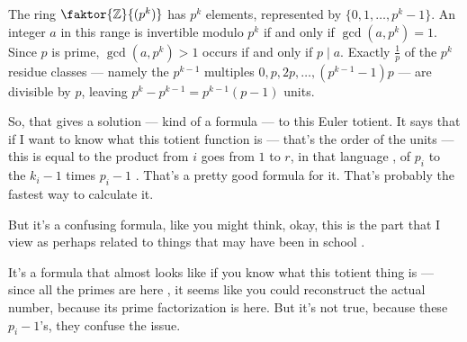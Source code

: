 \begin{content}

\begin{steps}
The ring $\faktor{\mathbb{Z}}{(p^k)}$ has $p^k$ elements, represented by $\{0, 1, \dots, p^k - 1\}$. An integer $a$ in this range is invertible modulo $p^k$ if and only if $\gcd(a, p^k) = 1$. Since $p$ is prime, $\gcd(a, p^k) > 1$ occurs if and only if $p \mid a$. Exactly $\frac{1}{p}$ of the $p^k$ residue classes --- namely the $p^{k-1}$ multiples $0, p, 2p, \dots, (p^{k-1} - 1)p$ --- are divisible by $p$, leaving $p^k - p^{k-1} = p^{k-1}(p - 1)$ units.
\end{steps}
\end{content}

\begin{speech}[00:19:58 - 00:21:04]
So, that gives a solution --- kind of a formula --- to this Euler totient. It says that if I want to know what this totient function is  --- that's the order of the units --- this is equal to the product from $i$ goes from $1$ to $r$, in that language , of $p_i$ to the $k_i - 1$ times $p_i - 1$ . That's a pretty good formula for it. That's probably the fastest way to calculate it.

But it's a confusing formula, like you might think, okay, this is the part that I view as perhaps related to things that may have been in school .

It's a formula that almost looks like if you know what this totient thing is --- since all the primes are here , it seems like you could reconstruct the actual number, because its prime factorization is here. But it's not true, because these $p_i - 1$'s, they confuse the issue.
\end{speech}


